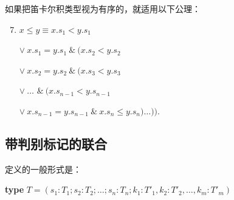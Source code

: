 \documentclass[twoside,11pt,fontset=none]{ctexbook}
\begin{document}
如果把笛卡尔积类型视为有序的，就适用以下公理：
	
\begin{enumerate}[leftmargin=2\parindent, label=(\arabic*)]
	\setcounter{enumi}{6}
	\item $x \leqslant y \equiv$\quad $x.s_1 < y.s_1$
		
	\tabto*{3.2em}$\vee\ x.s_1 = y.s_1\ \&\ (x.s_2 < y.s_2$
	
	\tabto*{3.2em}$\vee\ x.s_2 = y.s_2\ \&\ (x.s_3 < y.s_3$
	
	\tabto*{3.2em}$\vee\ \dots$ \tabto*{8.6em}$\&\ (x.s_{n - 1} < y.s_{n-1}$
	
	\tabto*{3.2em}$\vee\ x.s_{n-1} = y.s_{n-1}\ \&\ x.s_n \leqslant y.s_n)\dots)).$
\end{enumerate}

\subsection{带判别标记的联合}

定义的一般形式是：

\quad \textbf{type} $T = (s_1: T_1; s_2: T_2; \dots ; s_n:T_n; k_1: T'_1, k_2:T'_2, \dots , k_m: T'_m)$
\end{document}
